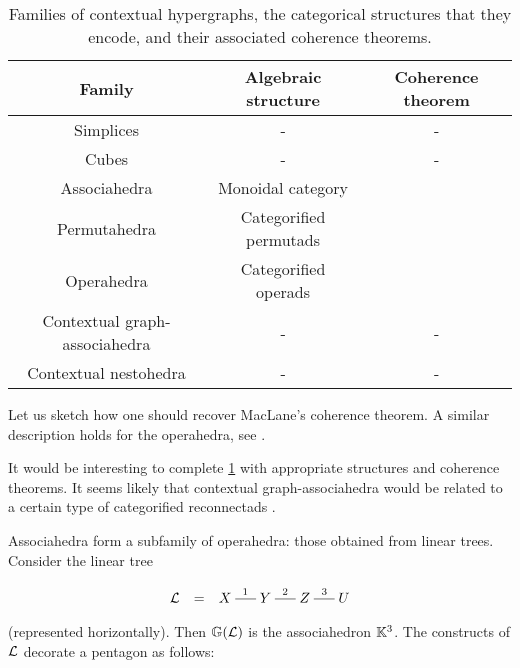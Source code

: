 \begin{table}[h!]
	\begin{center}
	\begin{tabular}{c|c|c}
	Family & Algebraic structure & Coherence theorem \\
	\hline
	Simplices & - & - \\
	Cubes & - & - \\
	Associahedra & Monoidal category & \cite{MacLane63} \\
	Permutahedra & Categorified permutads & \cite{CLA1} \\
	Operahedra & Categorified operads & \cite{DP15,CLA1} \\
	Contextual graph-associahedra & - & - \\
	Contextual nestohedra & - & - 
	\end{tabular}
	\end{center}
  \caption{Families of contextual hypergraphs, the categorical structures that they encode, and their associated coherence theorems.}
  \label{table:contextual-hyper}
\end{table}

Let us sketch how one should recover MacLane's coherence theorem. 
A similar description holds for the operahedra, see \cite{CLA1}. 

\begin{rem}
  It would be interesting to complete \cref{table:contextual-hyper} with appropriate structures and coherence theorems.
  It seems likely that contextual graph-associahedra would be related to a certain type of categorified reconnectads \cite{DotsenkoKeilthyLyskov}.
\end{rem}


Associahedra form a subfamily of operahedra: those obtained from linear trees.  Consider the linear tree

\vspace{-1cm}
\begin{center}
$$\xymatrix @-1.65pc {{\cal L} & = &X \ar @{-}[rr]^{1}&& Y \ar @{-}[rr]^{2}&& Z \ar @{-}[rr]^{3}&& U}
 $$
 \end{center}
 \vspace{-.2cm}
 
 \noindent
 (represented horizontally).  Then ${\mathbb G}({\cal L})$ is the associahedron ${\mathbb K}^3$. The constructs of
  ${\cal L}$ decorate a pentagon as follows:

